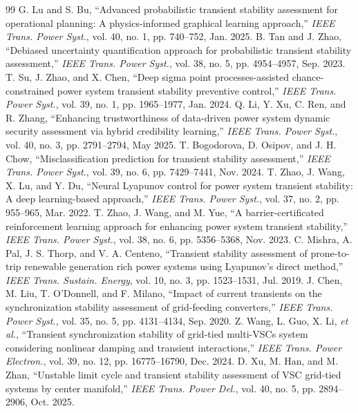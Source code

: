 \documentclass[conference]{IEEEtran}
\begin{document}
\balance
\begin{thebibliography}{99}
 G. Lu and S. Bu, ``Advanced probabilistic transient stability assessment for operational planning: A physics-informed graphical learning approach,'' \emph{IEEE Trans. Power Syst.}, vol. 40, no. 1, pp. 740--752, Jan. 2025.
 B. Tan and J. Zhao, ``Debiased uncertainty quantification approach for probabilistic transient stability assessment,'' \emph{IEEE Trans. Power Syst.}, vol. 38, no. 5, pp. 4954--4957, Sep. 2023.
 T. Su, J. Zhao, and X. Chen, ``Deep sigma point processes-assisted chance-constrained power system transient stability preventive control,'' \emph{IEEE Trans. Power Syst.}, vol. 39, no. 1, pp. 1965--1977, Jan. 2024.
 Q. Li, Y. Xu, C. Ren, and R. Zhang, ``Enhancing trustworthiness of data-driven power system dynamic security assessment via hybrid credibility learning,'' \emph{IEEE Trans. Power Syst.}, vol. 40, no. 3, pp. 2791--2794, May 2025.
 T. Bogodorova, D. Osipov, and J. H. Chow, ``Misclassification prediction for transient stability assessment,'' \emph{IEEE Trans. Power Syst.}, vol. 39, no. 6, pp. 7429--7441, Nov. 2024.
 T. Zhao, J. Wang, X. Lu, and Y. Du, ``Neural Lyapunov control for power system transient stability: A deep learning-based approach,'' \emph{IEEE Trans. Power Syst.}, vol. 37, no. 2, pp. 955--965, Mar. 2022.
 T. Zhao, J. Wang, and M. Yue, ``A barrier-certificated reinforcement learning approach for enhancing power system transient stability,'' \emph{IEEE Trans. Power Syst.}, vol. 38, no. 6, pp. 5356--5368, Nov. 2023.
 C. Mishra, A. Pal, J. S. Thorp, and V. A. Centeno, ``Transient stability assessment of prone-to-trip renewable generation rich power systems using Lyapunov's direct method,'' \emph{IEEE Trans. Sustain. Energy}, vol. 10, no. 3, pp. 1523--1531, Jul. 2019.
 J. Chen, M. Liu, T. O'Donnell, and F. Milano, ``Impact of current transients on the synchronization stability assessment of grid-feeding converters,'' \emph{IEEE Trans. Power Syst.}, vol. 35, no. 5, pp. 4131--4134, Sep. 2020.
 Z. Wang, L. Guo, X. Li, \emph{et al.}, ``Transient synchronization stability of grid-tied multi-VSCs system considering nonlinear damping and transient interactions,'' \emph{IEEE Trans. Power Electron.}, vol. 39, no. 12, pp. 16775--16790, Dec. 2024.
 D. Xu, M. Han, and M. Zhan, ``Unstable limit cycle and transient stability assessment of VSC grid-tied systems by center manifold,'' \emph{IEEE Trans. Power Del.}, vol. 40, no. 5, pp. 2894--2906, Oct. 2025.

\end{thebibliography}
\end{document}
